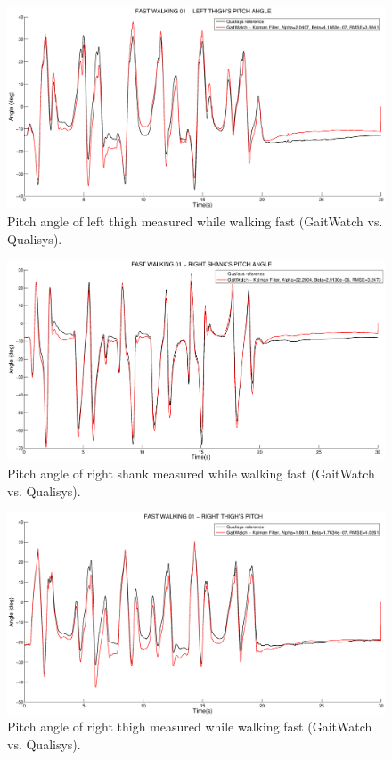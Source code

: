 \begin{figure}[H]
\centering
\includegraphics[width=1\textwidth]{figures/fast_walking_01_left_thigh.eps}
\caption{Pitch angle of left thigh measured while walking fast (GaitWatch vs. Qualisys).}
\label{fig:fast_walking_left_thigh01}
\end{figure}

\begin{figure}[H]
\centering
\includegraphics[width=1\textwidth]{figures/fast_walking_01_right_shank.eps}
\caption{Pitch angle of right shank measured while walking fast (GaitWatch vs. Qualisys).}
\label{fig:fast_walking_right_shank01}
\end{figure}

\begin{figure}[H]
\centering
\includegraphics[width=1\textwidth]{figures/fast_walking_01_right_thigh.eps}
\caption{Pitch angle of right thigh measured while walking fast (GaitWatch vs. Qualisys).}
\label{fig:fast_walking_right_thigh01}
\end{figure}

